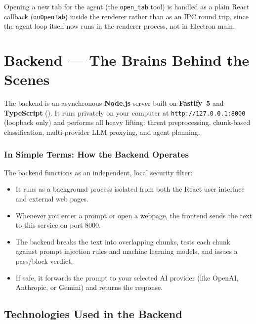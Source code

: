 \documentclass[11pt,a4paper]{article}
\newcommand{\pth}[1]{\texttt{\seqsplit{#1}}}
\begin{document}
Opening a new tab for the agent (the \texttt{open\_tab} tool) is handled as a plain React callback (\texttt{onOpenTab}) inside the renderer rather than as an IPC round trip, since the agent loop itself now runs in the renderer process, not in Electron main.

\section{Backend --- The Brains Behind the Scenes}

The backend is an asynchronous \textbf{Node.js} server built on \textbf{Fastify~5} and \textbf{TypeScript} (\pth{backend-node/}). It runs privately on your computer at \texttt{http://127.0.0.1:8000} (loopback only) and performs all heavy lifting: threat preprocessing, chunk-based classification, multi-provider LLM proxying, and agent planning.

\subsubsection*{In Simple Terms: How the Backend Operates}
The backend functions as an independent, local security filter:
\begin{itemize}[leftmargin=1.2em, itemsep=2pt]
\item It runs as a background process isolated from both the React user interface and external web pages.
\item Whenever you enter a prompt or open a webpage, the frontend sends the text to this service on port 8000.
\item The backend breaks the text into overlapping chunks, tests each chunk against prompt injection rules and machine learning models, and issues a pass/block verdict.
\item If safe, it forwards the prompt to your selected AI provider (like OpenAI, Anthropic, or Gemini) and returns the response.
\end{itemize}

\subsection{Technologies Used in the Backend}
\end{document}
